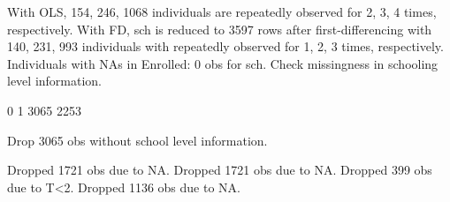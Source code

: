 With OLS,  154, 246, 1068 individuals are repeatedly observed for 2, 3, 4 times, respectively. With FD, \textsf{sch} is reduced to 3597 rows after first-differencing with 140, 231, 993 individuals with repeatedly observed for 1, 2, 3 times, respectively.
Individuals with NAs in \textsf{Enrolled}: 0 obs for \textsf{sch}. 
Check missingness in schooling level information.
\begin{Schunk}
\begin{Soutput}

   0    1 
3065 2253 
\end{Soutput}
\end{Schunk}
Drop 3065 obs without school level information.




\begin{Schunk}
\begin{Soutput}
Dropped 1721 obs due to NA.
Dropped 1721 obs due to NA.
Dropped 399 obs due to T<2.
Dropped 1136 obs due to NA.
\end{Soutput}
\end{Schunk}






